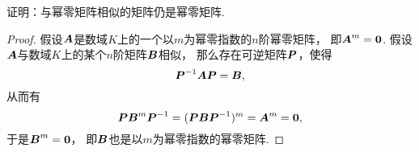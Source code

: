 \begin{example}\label{example:幂零矩阵.幂零矩阵的相似类}
证明：与幂零矩阵相似的矩阵仍是幂零矩阵.
\begin{proof}
假设\(\boldsymbol{A}\)是数域\(K\)上的一个以\(m\)为幂零指数的\(n\)阶幂零矩阵，
即\(\boldsymbol{A}^m=\boldsymbol0\).
假设\(\boldsymbol{A}\)与数域\(K\)上的某个\(n\)阶矩阵\(\boldsymbol{B}\)相似，
那么存在可逆矩阵\(\boldsymbol{P}\)，使得\begin{equation*}
	\boldsymbol{P}^{-1}\boldsymbol{A}\boldsymbol{P} = \boldsymbol{B},
\end{equation*}
从而有\begin{equation*}
	\boldsymbol{P}\boldsymbol{B}^m\boldsymbol{P}^{-1}
	= (\boldsymbol{P}\boldsymbol{B}\boldsymbol{P}^{-1})^m
	= \boldsymbol{A}^m
	= \boldsymbol0,
\end{equation*}
于是\(\boldsymbol{B}^m=\boldsymbol0\)，
即\(\boldsymbol{B}\)也是以\(m\)为幂零指数的幂零矩阵.
\end{proof}
\end{example}
